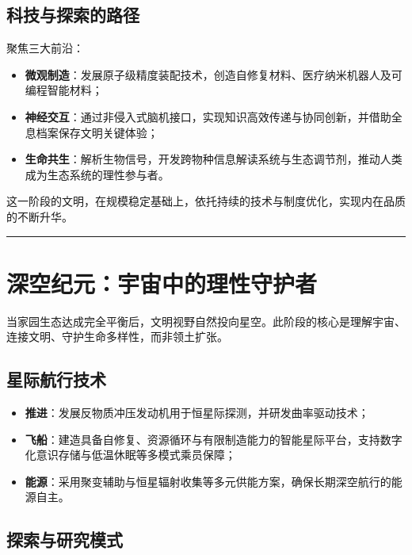 \subsection{科技与探索的路径}\label{ux79d1ux6280ux4e0eux63a2ux7d22ux7684ux8defux5f84}

聚焦三大前沿：

\begin{itemize}
\item
  \textbf{微观制造}：发展原子级精度装配技术，创造自修复材料、医疗纳米机器人及可编程智能材料；
\item
  \textbf{神经交互}：通过非侵入式脑机接口，实现知识高效传递与协同创新，并借助全息档案保存文明关键体验；
\item
  \textbf{生命共生}：解析生物信号，开发跨物种信息解读系统与生态调节剂，推动人类成为生态系统的理性参与者。
\end{itemize}

这一阶段的文明，在规模稳定基础上，依托持续的技术与制度优化，实现内在品质的不断升华。

\begin{center}\rule{0.5\linewidth}{0.5pt}\end{center}

\section{深空纪元：宇宙中的理性守护者}\label{ux6df1ux7a7aux7eaaux5143ux5b87ux5b99ux4e2dux7684ux7406ux6027ux5b88ux62a4ux8005}

当家园生态达成完全平衡后，文明视野自然投向星空。此阶段的核心是理解宇宙、连接文明、守护生命多样性，而非领土扩张。

\subsection{星际航行技术}\label{ux661fux9645ux822aux884cux6280ux672f}

\begin{itemize}
\tightlist
\item
  \textbf{推进}：发展反物质冲压发动机用于恒星际探测，并研发曲率驱动技术；
\item
  \textbf{飞船}：建造具备自修复、资源循环与有限制造能力的智能星际平台，支持数字化意识存储与低温休眠等多模式乘员保障；
\item
  \textbf{能源}：采用聚变辅助与恒星辐射收集等多元供能方案，确保长期深空航行的能源自主。
\end{itemize}

\subsection{探索与研究模式}\label{ux63a2ux7d22ux4e0eux7814ux7a76ux6a21ux5f0f}

